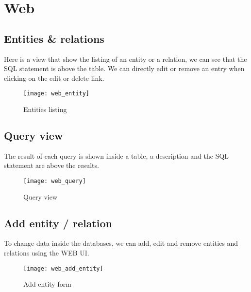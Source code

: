 %
%
%
%

\chapter{Web}

\section{Entities \& relations}

Here is a view that show the listing of an entity or a relation, we can see that the SQL statement is above the table.
We can directly edit or remove an entry when clicking on the edit or delete link.

\begin{figure}[!ht]
	\centering
	\texttt{[image: web\_entity]}
	\caption{Entities listing\label{fig:ddl-scheme}}
\end{figure}

\newpage
\section{Query view}

The result of each query is shown inside a table, a description and the SQL statement are above the results.

\begin{figure}[!ht]
	\centering
	\texttt{[image: web\_query]}
	\caption{Query view\label{fig:ddl-scheme}}
\end{figure}

\newpage
\section{Add entity / relation}

To change data inside the databases, we can add, edit and remove entities and relations using the WEB UI.

\begin{figure}[!ht]
	\centering
	\texttt{[image: web\_add\_entity]}
	\caption{Add entity form\label{fig:ddl-scheme}}
\end{figure}



